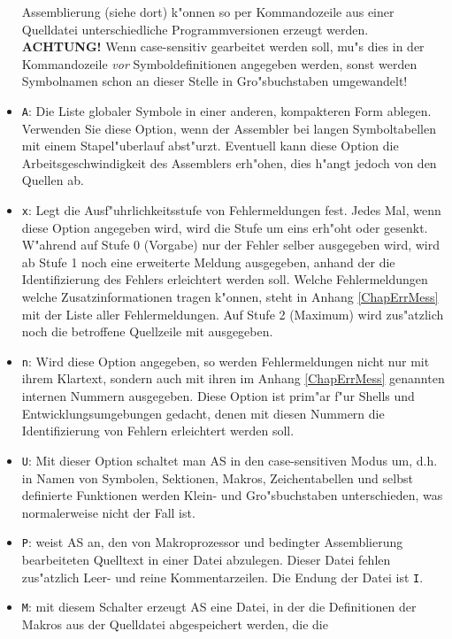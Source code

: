 \documentclass[12pt,a4paper,twoside]{report}
\newcommand{\tty}[1]{{\tt #1}}
\begin{document}
\begin{itemize}
{      Assemblierung (siehe dort) k"onnen so per Kommandozeile aus einer
      Quelldatei unterschiedliche Programmversionen erzeugt werden.
      {\bf ACHTUNG!} Wenn case-sensitiv gearbeitet werden soll, mu"s dies
      in der Kommandozeile {\em vor} Symboldefinitionen angegeben werden,
      sonst werden Symbolnamen schon an dieser Stelle in Gro"sbuchstaben
      umgewandelt!}
\item{\tty{A}: Die Liste globaler Symbole in einer anderen, kompakteren Form
      ablegen.  Verwenden Sie diese Option, wenn der Assembler bei
      langen Symboltabellen mit einem Stapel"uberlauf abst"urzt.
      Eventuell kann diese Option die Arbeitsgeschwindigkeit des
      Assemblers erh"ohen, dies h"angt jedoch von den Quellen ab.}
\item{\tty{x}: Legt die Ausf"uhrlichkeitsstufe von Fehlermeldungen fest.
      Jedes Mal, wenn diese Option angegeben wird, wird die Stufe
      um eins erh"oht oder gesenkt.  W"ahrend auf Stufe 0 (Vorgabe) nur
      der Fehler selber ausgegeben wird, wird ab Stufe 1 noch eine
      erweiterte Meldung ausgegeben, anhand der die Identifizierung des
      Fehlers erleichtert werden soll.  Welche Fehlermeldungen welche
      Zusatzinformationen tragen k"onnen, steht in Anhang \ref{ChapErrMess}
      mit der Liste aller Fehlermeldungen.  Auf Stufe 2 (Maximum) wird
      zus"atzlich noch die betroffene Quellzeile mit ausgegeben.}
\item{\tty{n}: Wird diese Option angegeben, so werden Fehlermeldungen nicht nur
      mit ihrem Klartext, sondern auch mit ihren im Anhang
      \ref{ChapErrMess} genannten internen Nummern ausgegeben.  Diese
      Option ist prim"ar f"ur Shells und Entwicklungsumgebungen gedacht,
      denen mit diesen Nummern die Identifizierung von Fehlern erleichtert
      werden soll.}
\item{\tty{U}: Mit dieser Option schaltet man AS in den case-sensitiven
      Modus um, d.h. in Namen von Symbolen, Sektionen, Makros,
      Zeichentabellen und selbst definierte Funktionen werden Klein-
      und Gro"sbuchstaben unterschieden, was normalerweise nicht der
      Fall ist.}
\item{\tty{P}: weist AS an, den von Makroprozessor und bedingter Assemblierung
      bearbeiteten Quelltext in einer Datei abzulegen.  Dieser Datei
      fehlen zus"atzlich Leer- und reine Kommentarzeilen.  Die Endung
      der Datei ist \tty{I}.}
\item{\tty{M}: mit diesem Schalter erzeugt AS eine Datei, in der die Definitionen
      der Makros aus der Quelldatei abgespeichert werden, die die
}
\end{itemize}
\end{document}
